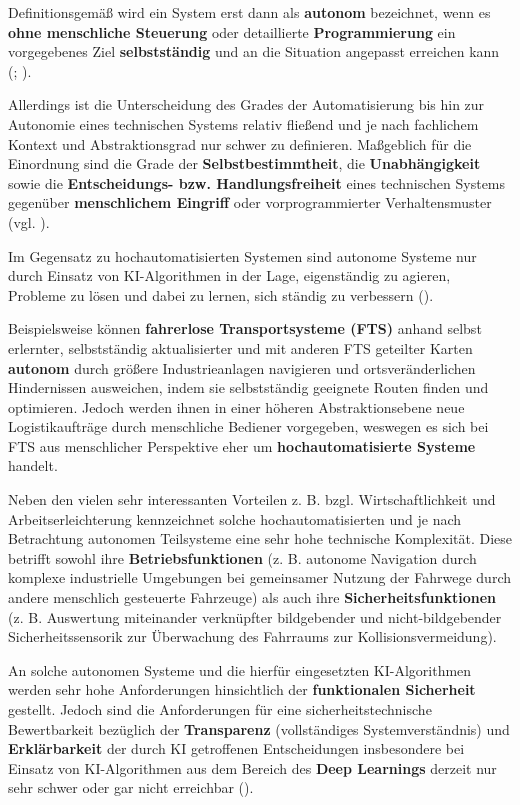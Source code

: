 \documentclass [oneside,10pt,a4paper,ngerman,BCOR10mm,headsepline,parindent,final]{scrartcl}
\begin{document}
Definitionsgemäß wird ein System erst dann als \textbf{autonom}
bezeichnet, wenn es \textbf{ohne menschliche Steuerung} oder
detaillierte \textbf{Programmierung} ein vorgegebenes Ziel
\textbf{selbstständig} und an die Situation angepasst erreichen kann
(\cite{EFI_autSysteme_2018}; \cite{acatech_2017}).

Allerdings ist die Unterscheidung des Grades der Automatisierung bis hin
zur Autonomie eines technischen Systems relativ fließend und je nach
fachlichem Kontext und Abstraktionsgrad nur schwer zu definieren.
Maßgeblich für die Einordnung sind die Grade der
\textbf{Selbstbestimmtheit}, die \textbf{Unabhängigkeit} sowie die
\textbf{Entscheidungs- bzw. Handlungsfreiheit} eines technischen Systems
gegenüber \textbf{menschlichem Eingriff} oder vorprogrammierter
Verhaltensmuster (vgl. \cite{Wiki_Autonomie}).

Im Gegensatz zu hochautomatisierten Systemen sind autonome Systeme nur
durch Einsatz von KI-Algorithmen in der Lage, eigenständig zu agieren,
Probleme zu lösen und dabei zu lernen, sich ständig zu verbessern
(\cite{acatech_2017}).

Beispielsweise können \textbf{fahrerlose Transportsysteme (FTS)} anhand
selbst erlernter, selbstständig aktualisierter und mit anderen FTS
geteilter Karten \textbf{autonom} durch größere Industrieanlagen
navigieren und ortsveränderlichen Hindernissen ausweichen, indem sie
selbstständig geeignete Routen finden und optimieren. Jedoch werden
ihnen in einer höheren Abstraktionsebene neue Logistikaufträge durch
menschliche Bediener vorgegeben, weswegen es sich bei FTS aus
menschlicher Perspektive eher um \textbf{hochautomatisierte Systeme}
handelt.

Neben den vielen sehr interessanten Vorteilen z. B. bzgl.
Wirtschaftlichkeit und Arbeitserleichterung kennzeichnet solche
hochautomatisierten und je nach Betrachtung autonomen Teilsysteme eine
sehr hohe technische Komplexität. Diese betrifft sowohl ihre
\textbf{Betriebsfunktionen} (z. B. autonome Navigation durch komplexe
industrielle Umgebungen bei gemeinsamer Nutzung der Fahrwege durch
andere menschlich gesteuerte Fahrzeuge) als auch ihre
\textbf{Sicherheitsfunktionen} (z. B. Auswertung miteinander verknüpfter
bildgebender und nicht-bildgebender Sicherheitssensorik zur Überwachung
des Fahrraums zur Kollisionsvermeidung).

An solche autonomen Systeme und die hierfür eingesetzten KI-Algorithmen
werden sehr hohe Anforderungen hinsichtlich der \textbf{funktionalen
Sicherheit} gestellt. Jedoch sind die Anforderungen für eine
sicherheitstechnische Bewertbarkeit bezüglich der \textbf{Transparenz}
(vollständiges Systemverständnis) und \textbf{Erklärbarkeit} der durch
KI getroffenen Entscheidungen insbesondere bei Einsatz von
KI-Algorithmen aus dem Bereich des \textbf{Deep Learnings} derzeit nur
sehr schwer oder gar nicht erreichbar (\cite{Liggesmeyer_2019}).
\end{document}
